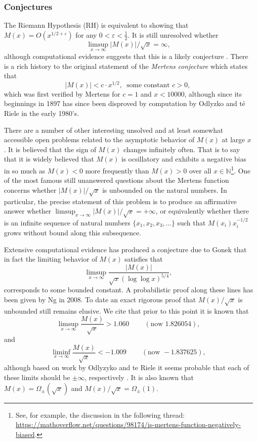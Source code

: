 \documentclass[11pt,reqno,a4letter]{article}
\numberwithin{figure}{section}
\numberwithin{table}{section}
\newcommand{\cf}{\textit{cf.\ }}
\theoremstyle{plain}
\numberwithin{theorem}{section}
\theoremstyle{definition}
\begin{document}
\subsubsection{Conjectures} 

The Riemann Hypothesis (RH) is equivalent to showing that 
$M(x) = O\left(x^{1/2+\varepsilon}\right)$ for any 
$0 < \varepsilon < \frac{1}{2}$. 
It is still unresolved whether 
\[ 
\limsup_{x\rightarrow\infty} |M(x)| / \sqrt{x} = \infty, 
\] 
although computational evidence suggests that this is a likely conjecture 
\cite{ORDER-MERTENSFN,HURST-2017}. 
There is a rich history to the original statement of the \emph{Mertens conjecture} which 
states that 
\[ 
|M(x)| < c \cdot x^{1/2},\ \text{ some constant $c > 0$, }
\] 
which was first verified by Mertens for $c = 1$ and $x < 10000$, 
although since its beginnings in 1897 has since been disproved by computation by 
Odlyzko and t\'{e} Riele in the early 1980's. 

There are a number of other interesting unsolved and at 
least somewhat accessible open problems 
related to the asymptotic behavior of $M(x)$ at large $x$. 
It is believed that the sign of $M(x)$ changes infinitely often. 
That is to say that it is widely believed that $M(x)$ is 
ocsillatory and exhibits a negative bias in so much as 
$M(x) < 0$ more frequently than $M(x) > 0$ over all 
$x \in \mathbb{N}$\footnote{ 
     See, for example, the discussion in the following thread: \\ 
     \url{https://mathoverflow.net/questions/98174/is-mertens-function-negatively-biased}. 
}. 
One of the most famous still unanswered questions about the Mertens 
function concerns whether $|M(x)| / \sqrt{x}$ is unbounded on the 
natural numbers. In particular, the precise statement of this 
problem is to produce an affirmative answer whether 
$\limsup_{x \rightarrow \infty} |M(x)| / \sqrt{x} = +\infty$, or 
equivalently whether there is an infinite sequence of natural numbers 
$\{x_1, x_2, x_3, \ldots\}$ such that $M(x_i) x_i^{-1/2}$ grows without 
bound along this subsequence. 

Extensive computational evidence has produced 
a conjecture due to Gonek that in fact the limiting behavior of 
$M(x)$ satisfies 
that $$\limsup_{x \rightarrow \infty} \frac{|M(x)|}{\sqrt{x} 
(\log\log x)^{5/4}},$$ 
corresponds to some bounded constant. 
A probabilistic proof along these 
lines has been given by Ng in 2008. To date an exact rigorous 
proof that $M(x) / \sqrt{x}$ is unbounded still remains elusive. 
We cite that prior to this point it is known that \cite[\cf \S 4.1]{PRIMEREC} 
\[
\limsup_{x\rightarrow\infty} \frac{M(x)}{\sqrt{x}} > 1.060\ \qquad (\text{now } 1.826054), 
\] 
and 
\[ 
\liminf_{x\rightarrow\infty} \frac{M(x)}{\sqrt{x}} < -1.009\ \qquad (\text{now } -1.837625), 
\] 
although based on work by Odlyzyko and te Riele it seems probable that 
each of these limits should be $\pm \infty$, respectively 
\cite{ODLYZ-TRIELE,MREVISITED,ORDER-MERTENSFN,HURST-2017}. 
It is also known that $M(x) = \Omega_{\pm}(\sqrt{x})$ and 
$M(x) / \sqrt{x} = \Omega_{\pm}(1)$. 
\end{document}
